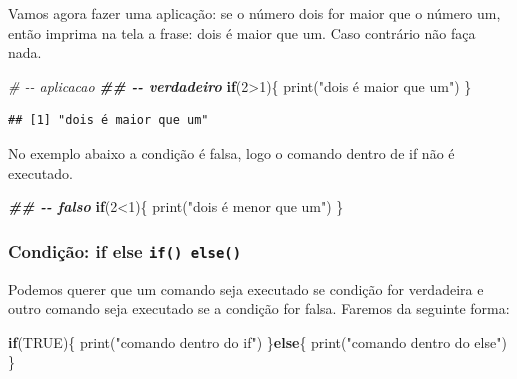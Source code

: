 \documentclass[
]{book}
\newenvironment{Shaded}{\begin{snugshade}}{\end{snugshade}}
\newcommand{\CommentTok}[1]{\textcolor[rgb]{0.56,0.35,0.01}{\textit{#1}}}
\newcommand{\ConstantTok}[1]{\textcolor[rgb]{0.00,0.00,0.00}{#1}}
\newcommand{\ControlFlowTok}[1]{\textcolor[rgb]{0.13,0.29,0.53}{\textbf{#1}}}
\newcommand{\DecValTok}[1]{\textcolor[rgb]{0.00,0.00,0.81}{#1}}
\newcommand{\DocumentationTok}[1]{\textcolor[rgb]{0.56,0.35,0.01}{\textbf{\textit{#1}}}}
\newcommand{\FunctionTok}[1]{\textcolor[rgb]{0.00,0.00,0.00}{#1}}
\newcommand{\NormalTok}[1]{#1}
\newcommand{\SpecialCharTok}[1]{\textcolor[rgb]{0.00,0.00,0.00}{#1}}
\newcommand{\StringTok}[1]{\textcolor[rgb]{0.31,0.60,0.02}{#1}}
\theoremstyle{definition}
\theoremstyle{definition}
\theoremstyle{definition}
\theoremstyle{definition}
\theoremstyle{remark}
\begin{document}
Vamos agora fazer uma aplicação: se o número dois for maior que o número um, então imprima na tela a frase: dois é maior que um. Caso contrário não faça nada.

\begin{Shaded}
\begin{Highlighting}[]
\CommentTok{\# {-}{-} aplicacao}
\DocumentationTok{\#\# {-}{-} verdadeiro}
\ControlFlowTok{if}\NormalTok{(}\DecValTok{2}\SpecialCharTok{\textgreater{}}\DecValTok{1}\NormalTok{)\{}
  \FunctionTok{print}\NormalTok{(}\StringTok{"dois é maior que um"}\NormalTok{)}
\NormalTok{\}}
\end{Highlighting}
\end{Shaded}

\begin{verbatim}
## [1] "dois é maior que um"
\end{verbatim}

No exemplo abaixo a condição é falsa, logo o comando dentro de if não é executado.

\begin{Shaded}
\begin{Highlighting}[]
\DocumentationTok{\#\# {-}{-} falso}
\ControlFlowTok{if}\NormalTok{(}\DecValTok{2}\SpecialCharTok{\textless{}}\DecValTok{1}\NormalTok{)\{}
  \FunctionTok{print}\NormalTok{(}\StringTok{"dois é menor que um"}\NormalTok{)}
\NormalTok{\}}
\end{Highlighting}
\end{Shaded}

\hypertarget{condiuxe7uxe3o-if-else-if-else}{%
\subsubsection{\texorpdfstring{Condição: if else \texttt{if()\ else()}}{Condição: if else if() else()}}\label{condiuxe7uxe3o-if-else-if-else}}

Podemos querer que um comando seja executado se condição for verdadeira e outro comando seja executado se a condição for falsa. Faremos da seguinte forma:

\begin{Shaded}
\begin{Highlighting}[]
\ControlFlowTok{if}\NormalTok{(}\ConstantTok{TRUE}\NormalTok{)\{}
  \FunctionTok{print}\NormalTok{(}\StringTok{"comando dentro do if"}\NormalTok{)}
\NormalTok{\}}\ControlFlowTok{else}\NormalTok{\{}
  \FunctionTok{print}\NormalTok{(}\StringTok{"comando dentro do else"}\NormalTok{)}
\NormalTok{\}}
\end{Highlighting}
\end{Shaded}
\end{document}
